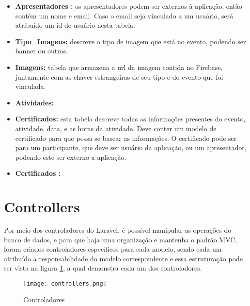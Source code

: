 \begin{itemize}
    \item \textbf{Apresentadores :} os apresentadores podem ser externos à aplicação, então contêm um nome e email. Caso o email seja vinculado a um usuário, será atribuído um id de usuário nesta tabela.
    
    \item \textbf{Tipo\_Imagens:} descreve o tipo de imagem que está no evento, podendo ser banner ou outros.
    
    \item \textbf{Imagens:} tabela que armazena a url da imagem contida no Firebase, juntamente com as chaves estrangeiras de seu tipo e do evento que foi vinculada.
    
    \item \textbf{Atividades:} 
    
    \item \textbf{Certificados:} esta tabela descreve todas as informações presentes do evento, atividade, data, e as horas da atividade. Deve conter um modelo de certificado para que possa se basear as informações. O certificado pode ser para um participante, que deve ser usuário da aplicação, ou um apresentador, podendo este ser externo a aplicação.
    
    \item \textbf{Certificados :}
    
\end{itemize}

\section{Controllers}
Por meio dos controladores do Laravel, é possível manipular as operações do banco de dados, e para que haja uma organização e mantenha o padrão MVC, foram criados controladores específicos para cada modelo, sendo cada um atribuído a responsabilidade do modelo correspondente e essa estruturação pode ser vista na figura \ref{controllers}, a qual demonstra cada um dos controladores.
\begin{figure}[H]
    \caption{\label{controllers}Controladores}
    \vspace{5pt}
    \centering
    \texttt{[image: controllers.png]}
    \vspace{5pt}
\end{figure}

